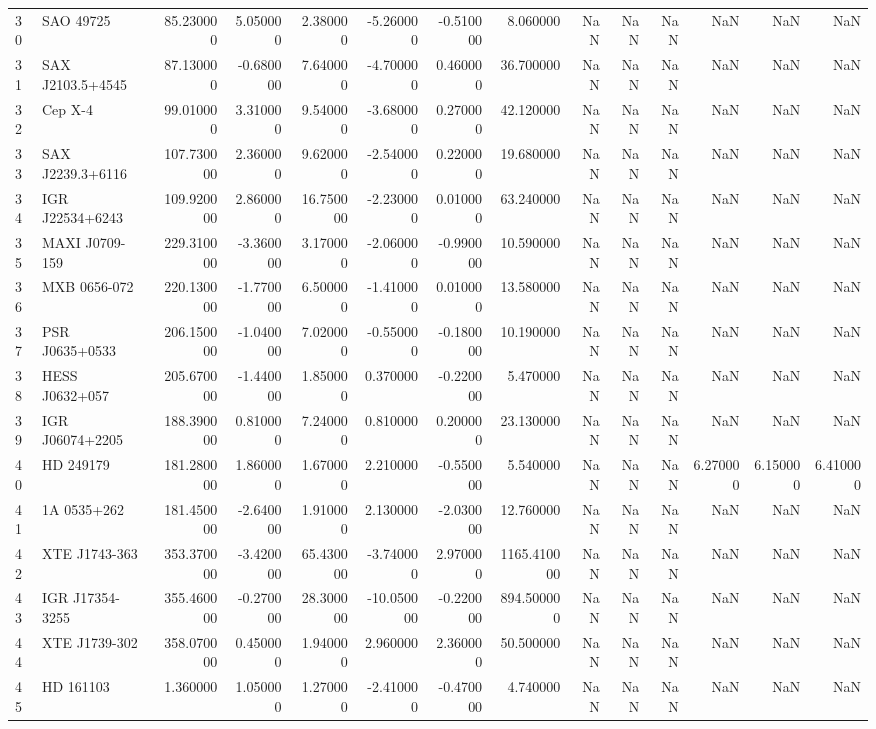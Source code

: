 \begin{tabular}{llrrrrrrrrrrrr}
30 & SAO 49725 & 85.230000 & 5.050000 & 2.380000 & -5.260000 & -0.510000 & 8.060000 & NaN & NaN & NaN & NaN & NaN & NaN \\
31 & SAX J2103.5+4545 & 87.130000 & -0.680000 & 7.640000 & -4.700000 & 0.460000 & 36.700000 & NaN & NaN & NaN & NaN & NaN & NaN \\
32 & Cep X-4 & 99.010000 & 3.310000 & 9.540000 & -3.680000 & 0.270000 & 42.120000 & NaN & NaN & NaN & NaN & NaN & NaN \\
33 & SAX J2239.3+6116 & 107.730000 & 2.360000 & 9.620000 & -2.540000 & 0.220000 & 19.680000 & NaN & NaN & NaN & NaN & NaN & NaN \\
34 & IGR J22534+6243 & 109.920000 & 2.860000 & 16.750000 & -2.230000 & 0.010000 & 63.240000 & NaN & NaN & NaN & NaN & NaN & NaN \\
35 & MAXI J0709-159 & 229.310000 & -3.360000 & 3.170000 & -2.060000 & -0.990000 & 10.590000 & NaN & NaN & NaN & NaN & NaN & NaN \\
36 & MXB 0656-072 & 220.130000 & -1.770000 & 6.500000 & -1.410000 & 0.010000 & 13.580000 & NaN & NaN & NaN & NaN & NaN & NaN \\
37 & PSR J0635+0533 & 206.150000 & -1.040000 & 7.020000 & -0.550000 & -0.180000 & 10.190000 & NaN & NaN & NaN & NaN & NaN & NaN \\
38 & HESS J0632+057 & 205.670000 & -1.440000 & 1.850000 & 0.370000 & -0.220000 & 5.470000 & NaN & NaN & NaN & NaN & NaN & NaN \\
39 & IGR J06074+2205 & 188.390000 & 0.810000 & 7.240000 & 0.810000 & 0.200000 & 23.130000 & NaN & NaN & NaN & NaN & NaN & NaN \\
40 & HD 249179 & 181.280000 & 1.860000 & 1.670000 & 2.210000 & -0.550000 & 5.540000 & NaN & NaN & NaN & 6.270000 & 6.150000 & 6.410000 \\
41 & 1A 0535+262 & 181.450000 & -2.640000 & 1.910000 & 2.130000 & -2.030000 & 12.760000 & NaN & NaN & NaN & NaN & NaN & NaN \\
42 & XTE J1743-363 & 353.370000 & -3.420000 & 65.430000 & -3.740000 & 2.970000 & 1165.410000 & NaN & NaN & NaN & NaN & NaN & NaN \\
43 & IGR J17354-3255 & 355.460000 & -0.270000 & 28.300000 & -10.050000 & -0.220000 & 894.500000 & NaN & NaN & NaN & NaN & NaN & NaN \\
44 & XTE J1739-302 & 358.070000 & 0.450000 & 1.940000 & 2.960000 & 2.360000 & 50.500000 & NaN & NaN & NaN & NaN & NaN & NaN \\
45 & HD 161103 & 1.360000 & 1.050000 & 1.270000 & -2.410000 & -0.470000 & 4.740000 & NaN & NaN & NaN & NaN & NaN & NaN \\

\end{tabular}
